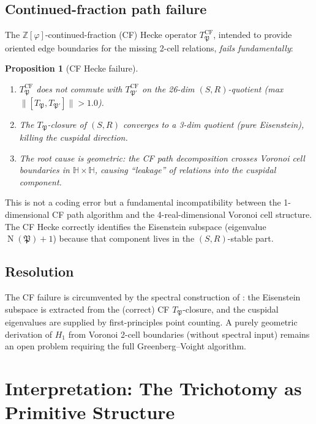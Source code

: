 \documentclass[11pt,a4paper]{article}
\theoremstyle{plain}
\newtheorem{proposition}[theorem]{Proposition}
\theoremstyle{definition}
\theoremstyle{remark}
\numberwithin{equation}{section}
\providecommand{\HH}{\mathbb{H}}
\providecommand{\ZZ}{\mathbb{Z}}
\providecommand{\fP}{\mathfrak{P}}
\DeclareMathOperator{\Nm}{N}
\begin{document}
\subsection{Continued-fraction path failure}

The $\ZZ[\varphi]$-continued-fraction (CF) Hecke operator $T_\fP^{\mathrm{CF}}$,
intended to provide oriented edge boundaries for the missing 2-cell relations,
\emph{fails fundamentally}:

\begin{proposition}[CF Hecke failure]\label{prop:cf-failure}
\begin{enumerate}[label=(\roman*)]
\item $T_\fP^{\mathrm{CF}}$ does not commute with $T_{\fP'}^{\mathrm{CF}}$
  on the 26-dim $(S,R)$-quotient (max $\|[T_\fP, T_{\fP'}]\| > 1.0$).
\item The $T_\fP$-closure of $(S,R)$ converges to a 3-dim quotient (pure
  Eisenstein), killing the cuspidal direction.
\item The root cause is geometric: the CF path decomposition crosses Voronoi
  cell boundaries in $\HH \times \HH$, causing ``leakage'' of relations into the
  cuspidal component.
\end{enumerate}
\end{proposition}

This is not a coding error but a fundamental incompatibility between the
1-dimensional CF path algorithm and the 4-real-dimensional Voronoi cell
structure.  The CF Hecke correctly identifies the Eisenstein subspace
(eigenvalue $\Nm(\fP)+1$) because that component lives in the $(S,R)$-stable
part.

\subsection{Resolution}

The CF failure is circumvented by the spectral construction of
: the Eisenstein subspace is extracted from the
(correct) CF $T_\fP$-closure, and the cuspidal eigenvalues are supplied by
first-principles point counting.  A purely geometric derivation of $H_1$
from Voronoi 2-cell boundaries (without spectral input) remains an open
problem requiring the full Greenberg--Voight algorithm.


\section{Interpretation: The Trichotomy as Primitive Structure}\label{sec:interpretation}
\end{document}

